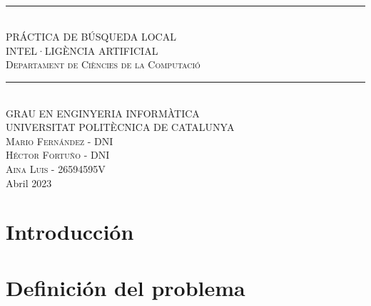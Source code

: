 \documentclass[10pt]{article}
\begin{document}
\begin{titlepage}

\newcommand{\HRule}{\rule{\linewidth}{0.5mm}}
\center
\textsc{ }\\[9cm]

\HRule \\[0.8cm]
{\LARGE PRÁCTICA DE BÚSQUEDA LOCAL}\\[1cm]
\textsc{INTEL·LIGÈNCIA ARTIFICIAL}\\
\textsc{Departament de Ciències de la Computació}\\[0.5cm]
\HRule \\[1cm]

\textsc{GRAU EN ENGINYERIA INFORMÀTICA}\\
\textsc{UNIVERSITAT POLITÈCNICA DE CATALUNYA}\\[9cm]

\vfill
\textsc{Mario Fernández - DNI} \\ [0.3cm]
\textsc{Héctor Fortuño - DNI}\\[0.3cm]
\textsc{Aina Luis - 26594595V}\\[0.3cm]
{\large Abril 2023}\\

\end{titlepage}

\pagestyle{empty}


\newpage
\tableofcontents
\newpage
\setcounter{page}{1}
\pagestyle{plain}
\section{Introducción}

\section{Definición del problema}
\end{document}
